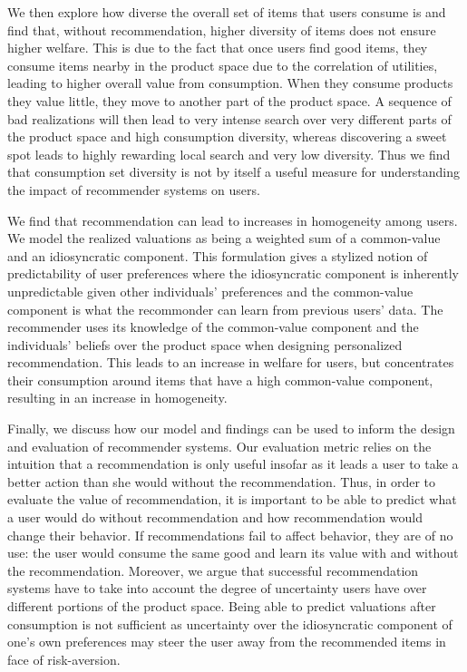 \documentclass[sigconf, anonymous, review]{acmart}
\begin{document}
We then explore how diverse the overall set of items that users consume is and find that, without recommendation, higher diversity of items does not ensure higher welfare.
This is due to the fact that once users find good items, they consume items nearby in the product space due to the correlation of utilities, leading to higher overall value from consumption. When they consume products they value little, they move to another part of the product space. A sequence of bad realizations will then lead to very intense search over very different parts of the product space and high consumption diversity, whereas discovering a sweet spot leads to highly rewarding local search and very low diversity. Thus we find that consumption set diversity is not by itself a useful measure for understanding the impact of recommender systems on users. 
\par

We find that recommendation can lead to increases in homogeneity among users. We model the realized valuations as being a weighted sum of a common-value and an idiosyncratic component. This formulation gives a stylized notion of predictability of user preferences where the idiosyncratic component is inherently unpredictable given other individuals' preferences and the common-value component is what the recommonder can learn from previous users' data. The recommender uses its knowledge of the common-value component and the individuals' beliefs over the product space when designing personalized recommendation. This leads to an increase in welfare for users, but concentrates their consumption around items that have a high common-value component, resulting in an increase in homogeneity.
\par

Finally, we discuss how our model and findings can be used to inform the design and evaluation of recommender systems. Our evaluation metric relies on the intuition that a recommendation is only useful insofar as it leads a user to take a better action than she would without the recommendation. Thus, in order to evaluate the value of recommendation, it is important to be able to predict what a user would do without recommendation and how recommendation would change their behavior. If recommendations fail to affect behavior, they are of no use: the user would consume the same good and learn its value with and without the recommendation. Moreover, we argue that successful recommendation systems have to take into account the degree of uncertainty users have over different portions of the product space. Being able to predict valuations after consumption is not sufficient as uncertainty over the idiosyncratic component of one's own preferences may steer the user away from the recommended items in face of risk-aversion.
\par
\end{document}
